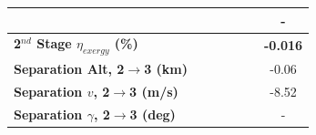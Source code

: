 \begin{table}[ht]
\begin{tabular}{l c c c c c c}
	& \firstsecondSeparationgammamSPARTANNinetyFive
	& \firstsecondSeparationgammamSPARTANNinetySevenFive
	& \firstsecondSeparationgammamSPARTANStandard
	& \firstsecondSeparationgammamSPARTANOneHundredTwoFive
	& \firstsecondSeparationgammamSPARTANOneHundredFive
	& -
	\\
	\hline 
	\textbf{2$^{nd}$ Stage $\eta_{exergy}$ (\%)}
	& \textbf{\secondExergyEffmSPARTANNinetyFive}
	& \textbf{\secondExergyEffmSPARTANNinetySevenFive}
	& \textbf{\secondExergyEffmSPARTANStandard}
	& \textbf{\secondExergyEffmSPARTANOneHundredTwoFive}
	& \textbf{\secondExergyEffmSPARTANOneHundredFive}
	& \textbf{-0.016}
	\\
	\textbf{Separation Alt, 2$\rightarrow$3 (km)}
	& \secondthirdSeparationAltmSPARTANNinetyFive
	& \secondthirdSeparationAltmSPARTANNinetySevenFive
	& \secondthirdSeparationAltmSPARTANStandard
	& \secondthirdSeparationAltmSPARTANOneHundredTwoFive
	& \secondthirdSeparationAltmSPARTANOneHundredFive
	&-0.06
	\\
	\textbf{Separation $v$, 2$\rightarrow$3 (m/s)}
	& \secondthirdSeparationvmSPARTANNinetyFive
	& \secondthirdSeparationvmSPARTANNinetySevenFive
	& \secondthirdSeparationvmSPARTANStandard
	& \secondthirdSeparationvmSPARTANOneHundredTwoFive
	& \secondthirdSeparationvmSPARTANOneHundredFive
	&-8.52
	\\
	\textbf{Separation $\gamma$, 2$\rightarrow$3 (deg)}
	& \secondthirdSeparationgammamSPARTANNinetyFive
	& \secondthirdSeparationgammamSPARTANNinetySevenFive
	& \secondthirdSeparationgammamSPARTANStandard
	& \secondthirdSeparationgammamSPARTANOneHundredTwoFive
	& \secondthirdSeparationgammamSPARTANOneHundredFive
	& -
	\\


\end{tabular}
\end{table}
